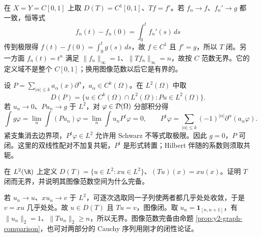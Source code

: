 \begin{example}[闭而无界的微分算子]
在 $X=Y=C[0,1]$ 上取 $D(T)=C^1[0,1]$、$Tf=f'$。若 $f_n\to f$、$f_n'\to g$ 都一致，恒等式
\[
 f_n(t)-f_n(0)=\int_0^tf_n'(s)\,ds
\]
传到极限得 $f(t)-f(0)=\int_0^tg(s)\,ds$，故 $f\in C^1$ 且 $f'=g$，所以 $T$ 闭。另一方面 $f_n(t)=t^n$ 满足 $\|f_n\|_\infty=1$、$\|Tf_n\|_\infty=n$，故按 $C$ 范数无界。它的定义域不是整个 $C[0,1]$；换用图像范数以后它是有界的。
\end{example}

\begin{example}[微分算子的可闭性与形式转置]
设 $P=\sum_{|\alpha|\le k}a_\alpha(x)\partial^\alpha$，$a_\alpha\in C^k(\Omega)$。在 $L^2(\Omega)$ 中取
\[
 D(P)=\{u\in C^k(\Omega)\cap L^2(\Omega):Pu\in L^2(\Omega)\}.
\]
若 $u_n\to0$、$Pu_n\to g$ 于 $L^2$，对 $\varphi\in\mathcal{D}(\Omega)$ 分部积分得
\[
 \int g\varphi=\lim_n\int(Pu_n)\varphi
 =\lim_n\int u_nP^t\varphi=0,\qquad
 P^t\varphi=\sum_{|\alpha|\le k}(-1)^{|\alpha|}\partial^\alpha(a_\alpha\varphi).
\]
紧支集消去边界项，$P^t\varphi\in L^2$ 允许用 Schwarz 不等式取极限。因此 $g=0$，$P$ 可闭。这里的双线性配对不加复共轭，$P^t$ 是形式转置；Hilbert 伴随的系数则须取共轭。
\end{example}

\begin{exercise}
在 $L^2(\R)$ 上定义 $D(T)=\{u\in L^2:xu\in L^2\}$、$(Tu)(x)=xu(x)$。证明 $T$ 闭而无界，并说明其图像范数空间为什么完备。
\end{exercise}
\begin{solution}
若 $u_n\to u$、$xu_n\to v$ 于 $L^2$，可逐次选取同一子列使两者都几乎处处收敛，于是 $v=xu$ 几乎处处。故 $u\in D(T)$ 且 $Tu=v$，图像闭。取 $u_n=\mathbf1_{[n,n+1]}$，有 $\|u_n\|_2=1$、$\|Tu_n\|_2\ge n$，所以无界。图像范数完备由命题 \ref{prop:y2-graph-comparison}，也可对两部分的 Cauchy 序列用刚才的闭性论证。
\end{solution}

